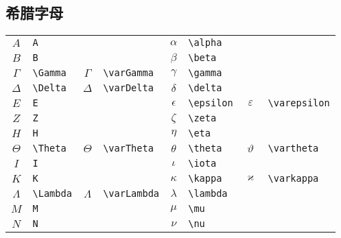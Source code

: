 \newpage
\subsection{希腊字母}
%
\begin{table}[h]
	\centering
	\begin{tabular}{c@{ }l c@{ }l c@{ }l c@{ }l}
		\hline
		$A$        & \verb|A|        &               &                    & $\alpha$   & \verb|\alpha|   &               &                    \\
		$B$        & \verb|B|        &               &                    & $\beta$    & \verb|\beta|    &               &                    \\
		$\Gamma$   & \verb|\Gamma|   & $\varGamma$   & \verb|\varGamma|   & $\gamma$   & \verb|\gamma|   &               &                    \\
		$\Delta$   & \verb|\Delta|   & $\varDelta$   & \verb|\varDelta|   & $\delta$   & \verb|\delta|   &               &                    \\
		$E$        & \verb|E|        &               &                    & $\epsilon$ & \verb|\epsilon| & $\varepsilon$ & \verb|\varepsilon| \\
		$Z$        & \verb|Z|        &               &                    & $\zeta$    & \verb|\zeta|    &               &                    \\
		$H$        & \verb|H|        &               &                    & $\eta$     & \verb|\eta|     &               &                    \\
		$\Theta$   & \verb|\Theta|   & $\varTheta$   & \verb|\varTheta|   & $\theta$   & \verb|\theta|   & $\vartheta$   & \verb|\vartheta|   \\
		$I$        & \verb|I|        &               &                    & $\iota$    & \verb|\iota|    &               &                    \\
		$K$        & \verb|K|        &               &                    & $\kappa$   & \verb|\kappa|   & $\varkappa$   & \verb|\varkappa|   \\
		$\Lambda$  & \verb|\Lambda|  & $\varLambda$  & \verb|\varLambda|  & $\lambda$  & \verb|\lambda|  &               &                    \\
		$M$        & \verb|M|        &               &                    & $\mu$      & \verb|\mu|      &               &                    \\
		$N$        & \verb|N|        &               &                    & $\nu$      & \verb|\nu|      &               &                    \\

\end{tabular}
\end{table}
